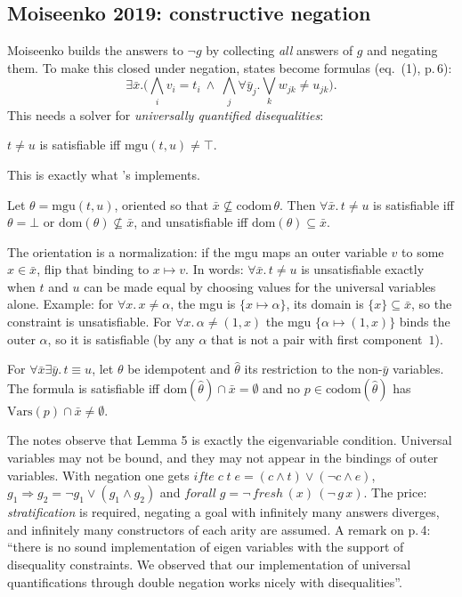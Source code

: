 \subsection{Moiseenko 2019: constructive negation}

Moiseenko \cite{Moiseenko2019} builds the answers to $\neg g$ by collecting \emph{all} answers of $g$
and negating them. To make this closed under negation, states become formulas (eq.~(1), p.\,6):
\[
  \exists\bar x.\Big(\bigwedge_i v_i=t_i\ \wedge\ \bigwedge_j\forall\bar y_j.\bigvee_k w_{jk}\neq u_{jk}\Big).
\]
This needs a solver for \emph{universally quantified disequalities}:
\begin{lemma}
$t\neq u$ is satisfiable iff $\mathrm{mgu}(t,u)\neq\top$.
\end{lemma}
\noindent This is exactly what \micro{}'s  implements.
\begin{lemma}
Let $\theta=\mathrm{mgu}(t,u)$, oriented so that $\bar x\not\subseteq\mathrm{codom}\,\theta$. Then
$\forall\bar x.\,t\neq u$ is satisfiable iff $\theta=\bot$ or $\mathrm{dom}(\theta)\not\subseteq\bar x$,
and unsatisfiable iff $\mathrm{dom}(\theta)\subseteq\bar x$.
\end{lemma}
\noindent The orientation is a normalization: if the mgu maps an outer variable $v$ to some $x\in\bar x$,
flip that binding to $x\mapsto v$. In words: $\forall\bar x.\,t\neq u$ is unsatisfiable exactly when $t$
and $u$ can be made equal by choosing values for the universal variables alone. Example: for
$\forall x.\,x\neq\alpha$, the mgu is $\{x\mapsto\alpha\}$, its domain is $\{x\}\subseteq\bar x$, so the
constraint is unsatisfiable. For $\forall x.\,\alpha\neq(1,x)$ the mgu $\{\alpha\mapsto(1,x)\}$ binds the
outer $\alpha$, so it is satisfiable (by any $\alpha$ that is not a pair with first component~$1$).
\begin{lemma}
For $\forall\bar x\exists\bar y.\,t\equiv u$, let $\theta$ be idempotent and $\hat\theta$ its restriction
to the non-$\bar y$ variables. The formula is satisfiable iff $\mathrm{dom}(\hat\theta)\cap\bar x=\emptyset$
and no $p\in\mathrm{codom}(\hat\theta)$ has $\mathrm{Vars}(p)\cap\bar x\neq\emptyset$.
\end{lemma}
\noindent The notes observe that Lemma 5 is exactly the eigenvariable condition. Universal variables
may not be bound, and they may not appear in the bindings of outer variables. With negation one gets
$\mathit{ifte}\;c\;t\;e=(c\wedge t)\vee(\neg c\wedge e)$, $g_1\Rightarrow g_2=\neg g_1\vee(g_1\wedge g_2)$
and $\mathit{forall}\;g=\neg\,\mathit{fresh}\,(x)\,(\neg\,g\,x)$. The price: \emph{stratification} is
required, negating a goal with infinitely many answers diverges, and infinitely many constructors of
each arity are assumed. A remark on p.\,4: \enquote{there is no sound implementation of eigen variables
with the support of disequality constraints. We observed that our implementation of universal
quantifications through double negation works nicely with disequalities}.

